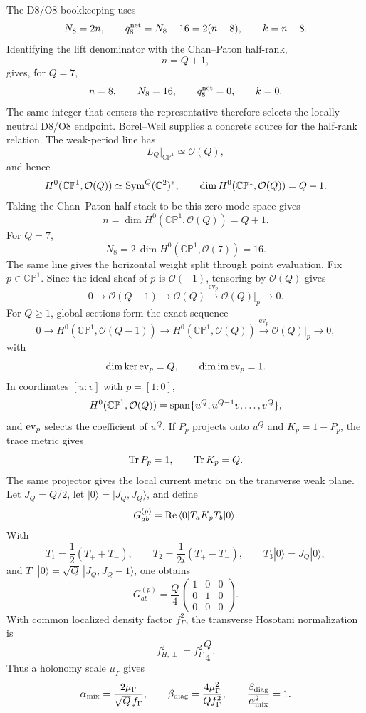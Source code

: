 \documentclass[11pt]{article}
\theoremstyle{definition}
\theoremstyle{remark}
\newcommand{\CP}{\mathbb{CP}}
\newcommand{\cO}{\mathcal O}
\begin{document}
The D8/O8 bookkeeping uses
\[
  N_8=2n,\qquad
  q_8^{\rm net}=N_8-16=2(n-8),\qquad
  k=n-8.
\]
Identifying the lift denominator with the Chan--Paton half-rank,
\[
  n=Q+1,
\]
gives, for \(Q=7\),
\[
  n=8,\qquad N_8=16,\qquad q_8^{\rm net}=0,\qquad k=0.
\]
The same integer that centers the representative therefore selects the locally
neutral D8/O8 endpoint.
Borel--Weil supplies a concrete source for the half-rank relation.  The
weak-period line has
\[
  L_Q|_{\CP^1}\simeq\cO(Q),
\]
and hence
\[
  H^0(\CP^1,\cO(Q))\simeq{\rm Sym}^Q(\mathbb C^2)^*,
  \qquad
  \dim H^0(\CP^1,\cO(Q))=Q+1.
\]
Taking the Chan--Paton half-stack to be this zero-mode space gives
\[
  n=\dim H^0(\CP^1,\cO(Q))=Q+1.
\]
For \(Q=7\),
\[
  N_8=2\,\dim H^0(\CP^1,\cO(7))=16.
\]
The same line gives the horizontal weight split through point evaluation.
Fix \(p\in\CP^1\).  Since the ideal sheaf of \(p\) is \(\cO(-1)\), tensoring
by \(\cO(Q)\) gives
\[
  0\longrightarrow \cO(Q-1)
  \longrightarrow \cO(Q)
  \stackrel{\mathrm{ev}_p}{\longrightarrow}
  \cO(Q)|_p
  \longrightarrow 0 .
\]
For \(Q\ge1\), global sections form the exact sequence
\[
  0\longrightarrow H^0(\CP^1,\cO(Q-1))
  \longrightarrow H^0(\CP^1,\cO(Q))
  \stackrel{\mathrm{ev}_p}{\longrightarrow}
  \cO(Q)|_p
  \longrightarrow 0 ,
\]
with
\[
  \dim\ker{\rm ev}_p=Q,\qquad
  \dim{\rm im}\,{\rm ev}_p=1 .
\]
In coordinates \([u:v]\) with \(p=[1:0]\),
\[
  H^0(\CP^1,\cO(Q))
  =
  {\rm span}\{u^Q,u^{Q-1}v,\ldots,v^Q\},
\]
and \({\rm ev}_p\) selects the coefficient of \(u^Q\).  If \(P_p\) projects
onto \(u^Q\) and \(K_p=1-P_p\), the trace metric gives
\[
  {\rm Tr}\,P_p=1,\qquad {\rm Tr}\,K_p=Q.
\]
The same projector gives the local current metric on the transverse weak
plane.  Let \(J_Q=Q/2\), let \(|0\rangle=|J_Q,J_Q\rangle\), and define
\[
  G_{ab}^{(p)}
  =
  {\rm Re}\,\langle0|T_aK_pT_b|0\rangle .
\]
With
\[
  T_1=\frac12(T_++T_-),\qquad
  T_2=\frac{1}{2i}(T_+-T_-),\qquad
  T_3|0\rangle=J_Q|0\rangle,
\]
and \(T_-|0\rangle=\sqrt Q\,|J_Q,J_Q-1\rangle\), one obtains
\[
  G_{ab}^{(p)}
  =
  \frac Q4
  \begin{pmatrix}
  1&0&0\\
  0&1&0\\
  0&0&0
  \end{pmatrix}.
\]
With common localized density factor \(f_\Gamma^2\), the transverse Hosotani
normalization is
\[
  f_{H,\perp}^2=f_\Gamma^2\frac Q4.
\]
Thus a holonomy scale \(\mu_\Gamma\) gives
\[
  \alpha_{\rm mix}=\frac{2\mu_\Gamma}{\sqrt Q\,f_\Gamma},
  \qquad
  \beta_{\rm diag}=\frac{4\mu_\Gamma^2}{Qf_\Gamma^2},
  \qquad
  \frac{\beta_{\rm diag}}{\alpha_{\rm mix}^2}=1 .
\]
\end{document}
